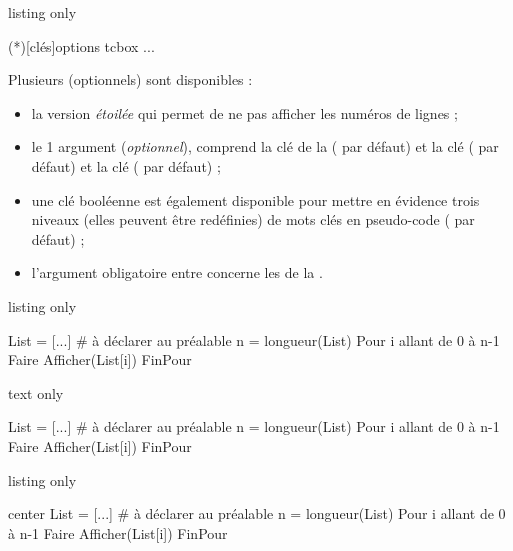 \begin{PresCodeTexPL}{listing only}
\begin{PseudoCodeAlt}(*)[clés]{options tcbox}
...
\end{PseudoCodeAlt}
\end{PresCodeTexPL}

\begin{cautionblock}
Plusieurs  (optionnels) sont disponibles :

\begin{itemize}
	\item la version \textit{étoilée} qui permet de ne pas afficher les numéros de lignes ;
	\item le 1 argument (\textit{optionnel}), comprend la clé  de la  ( par défaut) et la clé  ( par défaut) et la clé  (\Cle{14pt} par défaut) ;
	\item {} une clé booléenne  est également disponible pour mettre en évidence trois niveaux (elles peuvent être redéfinies) de mots clés en pseudo-code ( par défaut) ;
	\item {} l'argument obligatoire entre  concerne les  de la .
\end{itemize}
\vspace*{-\baselineskip}\leavevmode
\end{cautionblock}

\begin{PresCodeTexPL}{listing only}
\begin{PseudoCode}{} %
List = [...]          # à déclarer au préalable
n = longueur(List)
Pour i allant de 0 à n-1 Faire
	Afficher(List[i])
FinPour
\end{PseudoCode}
\end{PresCodeTexPL}

\begin{PresCodeSortiePL}{text only}
\begin{PseudoCode}{}
List = [...]          # à déclarer au préalable
n = longueur(List)
Pour i allant de 0 à n-1 Faire
	Afficher(List[i])
FinPour
\end{PseudoCode}
\end{PresCodeSortiePL}

\begin{PresCodeTexPL}{listing only}
\begin{PseudoCodeAlt}[Largeur=15cm,PremLigne=7,Couleur]{center} %
List = [...]          # à déclarer au préalable
n = longueur(List)
Pour i allant de 0 à n-1 Faire
	Afficher(List[i])
FinPour
\end{PseudoCodeAlt}
\end{PresCodeTexPL}

